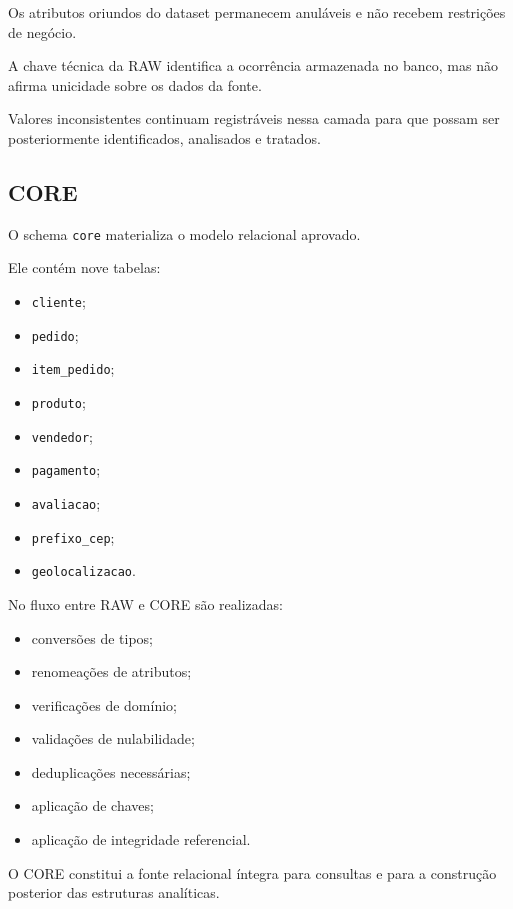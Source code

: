 \documentclass[12pt,a4paper]{article}
\begin{document}
	Os atributos oriundos do dataset permanecem anuláveis e não recebem
	restrições de negócio.
	
	A chave técnica da RAW identifica a ocorrência armazenada no banco,
	mas não afirma unicidade sobre os dados da fonte.
	
	Valores inconsistentes continuam registráveis nessa camada para que
	possam ser posteriormente identificados, analisados e tratados.
	
	\subsection{CORE}
	
	O schema \texttt{core} materializa o modelo relacional aprovado.
	
	Ele contém nove tabelas:
	
	\begin{itemize}[leftmargin=1.2cm]
		\item \texttt{cliente};
		\item \texttt{pedido};
		\item \texttt{item\_pedido};
		\item \texttt{produto};
		\item \texttt{vendedor};
		\item \texttt{pagamento};
		\item \texttt{avaliacao};
		\item \texttt{prefixo\_cep};
		\item \texttt{geolocalizacao}.
	\end{itemize}
	
	No fluxo entre RAW e CORE são realizadas:
	
	\begin{itemize}[leftmargin=1.2cm]
		\item conversões de tipos;
		\item renomeações de atributos;
		\item verificações de domínio;
		\item validações de nulabilidade;
		\item deduplicações necessárias;
		\item aplicação de chaves;
		\item aplicação de integridade referencial.
	\end{itemize}
	
	O CORE constitui a fonte relacional íntegra para consultas e para a
	construção posterior das estruturas analíticas.
	
\end{document}

